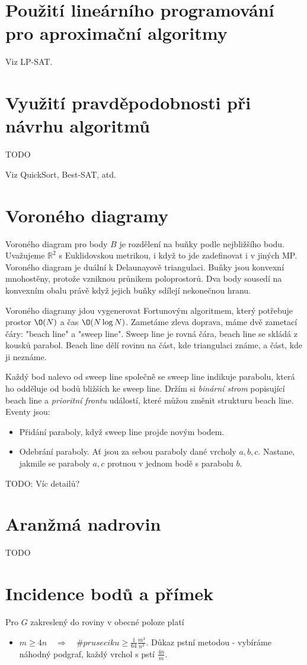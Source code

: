 \documentclass[a4paper,10pt,titlepage]{article} \usepackage[utf8]{inputenc}
\def\R{\mathbb{R}}
\begin{document}
\section{Použití lineárního programování pro aproximační algoritmy}
Viz LP-SAT.

\section{Využití pravděpodobnosti při návrhu algoritmů}
TODO

Viz QuickSort, Best-SAT, atd.

\section{Voroného diagramy}
Voroného diagram pro body $B$ je rozdělení na buňky podle nejbližšího
bodu. Uvažujeme $\R^2$ s Euklidovskou metrikou, i když to jde zadefinovat
i v jiných MP.
Voroného diagram je duální k Delaunayově triangulaci.
Buňky jsou konvexní mnohostěny, protože vzniknou průnikem poloprostorů.
Dva body sousedí na konvexním obalu právě když jejich buňky sdílejí nekonečnou
hranu.

Voroného diagramy jdou vygenerovat Fortunovým algoritmem, který potřebuje
prostor $\O(N)$ a čas $\O(N\log N)$. Zametáme zleva
doprava, máme dvě zametací čáry: "beach line" a "sweep line".
Sweep line je rovná čára, beach line se skládá z kousků parabol.
Beach line dělí rovinu na část, kde triangulaci známe, a část, kde ji neznáme.

Každý bod nalevo od sweep line společně se sweep line indikuje parabolu,
která ho odděluje od bodů bližších ke sweep line.
Držím si \emph{binární strom} popisující beach line a \emph{prioritní frontu}
událostí, které můžou změnit strukturu beach line.
Eventy jsou:
\begin{itemize}
\item Přidání paraboly, když sweep line projde novým bodem.
\item Odebrání paraboly. Ať jsou za sebou paraboly dané vrcholy $a,b,c$.
Nastane, jakmile se paraboly $a,c$ protnou v jednom bodě s parabolu $b$.
\end{itemize}

TODO: Víc detailů?

\section{Aranžmá nadrovin}
TODO

\section{Incidence bodů a přímek}
Pro $G$ zakreslený do roviny v obecné poloze platí
\begin{itemize}
\item $m \geq 4n \quad \Rightarrow \quad \#pruseciku \geq \frac{1}{64}\frac{m^3}{n^2}$.
\quad Důkaz pstní metodou - vybíráme náhodný podgraf, každý vrchol s pstí $\frac{4n}{m}$.
\end{itemize}
\end{document}
